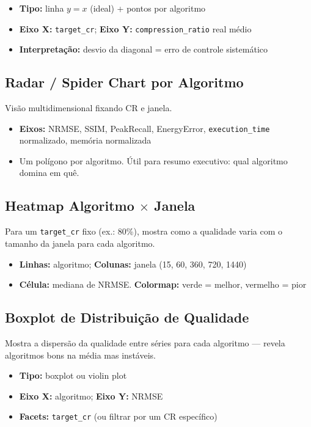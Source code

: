 \documentclass[12pt, a4paper]{article}
\begin{document}
\begin{itemize}
    \item \textbf{Tipo:} linha $y = x$ (ideal) + pontos por algoritmo
    \item \textbf{Eixo X:} \texttt{target\_cr}; \textbf{Eixo Y:} \texttt{compression\_ratio} real médio
    \item \textbf{Interpretação:} desvio da diagonal = erro de controle sistemático
\end{itemize}

\subsection{Radar / Spider Chart por Algoritmo}

Visão multidimensional fixando CR e janela.

\begin{itemize}
    \item \textbf{Eixos:} NRMSE, SSIM, PeakRecall, EnergyError, \texttt{execution\_time} normalizado, memória normalizada
    \item Um polígono por algoritmo. Útil para resumo executivo: qual algoritmo domina em quê.
\end{itemize}

\subsection{Heatmap Algoritmo $\times$ Janela}

Para um \texttt{target\_cr} fixo (ex.: 80\%), mostra como a qualidade varia com o tamanho da janela para cada algoritmo.

\begin{itemize}
    \item \textbf{Linhas:} algoritmo; \textbf{Colunas:} janela (15, 60, 360, 720, 1440)
    \item \textbf{Célula:} mediana de NRMSE. \textbf{Colormap:} verde = melhor, vermelho = pior
\end{itemize}

\subsection{Boxplot de Distribuição de Qualidade}

Mostra a dispersão da qualidade entre séries para cada algoritmo — revela algoritmos bons na média mas instáveis.

\begin{itemize}
    \item \textbf{Tipo:} boxplot ou violin plot
    \item \textbf{Eixo X:} algoritmo; \textbf{Eixo Y:} NRMSE
    \item \textbf{Facets:} \texttt{target\_cr} (ou filtrar por um CR específico)
\end{itemize}
\end{document}
